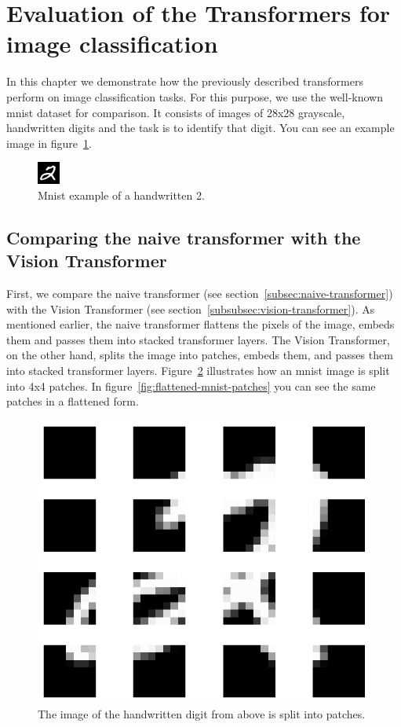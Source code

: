 \documentclass[a4paper]{scrartcl}
\let\stdsection\section
\renewcommand\section{\newpage\stdsection}
\begin{document}


    \section{Evaluation of the Transformers for image classification}\label{sec:evaluation-of-the-transformers-for-image-classification}
    In this chapter we demonstrate how the previously described transformers perform on image classification tasks.
    For this purpose, we use the well-known mnist dataset for comparison.
    It consists of images of 28x28 grayscale, handwritten digits and the task is to identify that digit.
    You can see an example image in figure~\ref{fig:mnist-example}.

    \begin{figure}[hbtp]
        \centering
        \includegraphics[width=0.2\linewidth]{img/plots/patches/example}
        \caption[Mnist example]{Mnist example of a handwritten 2.}
        \label{fig:mnist-example}
    \end{figure}

    \subsection{Comparing the naive transformer with the Vision Transformer}\label{subsec:comparing-the-naive-transformer-with-the-vision-transformer}

    First, we compare the naive transformer (see section~\ref{subsec:naive-transformer}) with the Vision Transformer (see section~\ref{subsubsec:vision-transformer}).
    As mentioned earlier, the naive transformer flattens the pixels of the image, embeds them and passes them into stacked transformer layers.
    The Vision Transformer, on the other hand, splits the image into patches, embeds them, and passes them into stacked transformer layers.
    Figure~\ref{fig:mnist-patches} illustrates how an mnist image is split into 4x4 patches.
    In figure~\ref{fig:flattened-mnist-patches} you can see the same patches in a flattened form.

    \begin{figure}[btp]
        \centering
        \includegraphics[width=0.2\linewidth]{img/plots/patches/example_tiles}
        \caption[Mnist example split into patches]{The image of the handwritten digit from above is split into patches.}
        \label{fig:mnist-patches}
    \end{figure}
\end{document}
